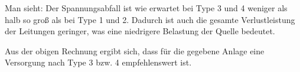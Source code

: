 Man sieht: Der Spannungsabfall ist wie erwartet bei Type 3 und 4 weniger als halb so groß als bei Type 1 und 2.
Dadurch ist auch die gesamte Verlustleistung der Leitungen geringer, was eine niedrigere Belastung der Quelle bedeutet.

Aus der obigen Rechnung ergibt sich, dass für die gegebene Anlage eine Versorgung nach Type 3 bzw. 4 empfehlenswert ist.